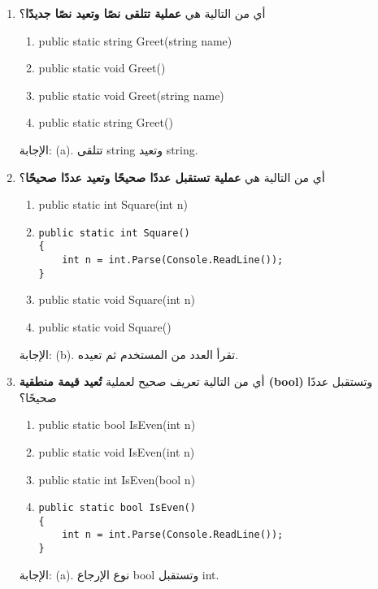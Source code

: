 \documentclass[14pt]{extarticle}
\begin{document}
\begin{enumerate}[itemsep=1.8em]

\clearpage
\item
أي من التالية هي \textbf{عملية تتلقى نصًا وتعيد نصًا جديدًا}؟
\begin{english}
\begin{enumerate}[label=(\alph*)]
    \item public static string Greet(string name)
    \item public static void Greet()
    \item public static void Greet(string name)
    \item public static string Greet()
\end{enumerate}
\end{english}
\ifwithsols
\begin{boxSolution}
الإجابة: (a).
تتلقى \textenglish{string} وتعيد \textenglish{string}.
\end{boxSolution}
\fi


\item
أي من التالية هي \textbf{عملية تستقبل عددًا صحيحًا وتعيد عددًا صحيحًا}؟
\begin{english}
\begin{enumerate}[label=(\alph*)]
    \item public static int Square(int n)
    \item \begin{verbatim}
public static int Square()
{
    int n = int.Parse(Console.ReadLine());
}
\end{verbatim}
    \item public static void Square(int n)
    \item public static void Square()
\end{enumerate}
\end{english}
\ifwithsols
\begin{boxSolution}
الإجابة: (b).
تقرأ العدد من المستخدم ثم تعيده.
\end{boxSolution}
\fi


\item
أي من التالية تعريف صحيح لعملية \textbf{تُعيد قيمة منطقية (bool)} وتستقبل عددًا صحيحًا؟
\begin{english}
\begin{enumerate}[label=(\alph*)]
    \item public static bool IsEven(int n)
    \item public static void IsEven(int n)
    \item public static int IsEven(bool n)
    \item \begin{verbatim}
public static bool IsEven()
{
    int n = int.Parse(Console.ReadLine());
}
\end{verbatim}
\end{enumerate}
\end{english}
\ifwithsols
\begin{boxSolution}
الإجابة: (a).
نوع الإرجاع \textenglish{bool} وتستقبل \textenglish{int}.
\end{boxSolution}
\fi


\end{enumerate}
\end{document}
